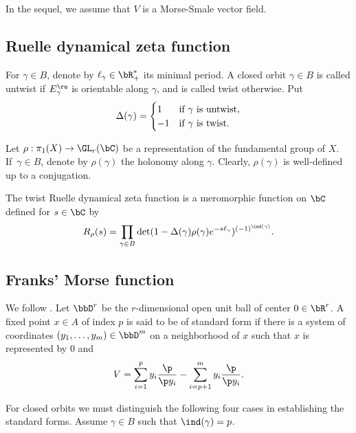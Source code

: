 In the sequel, we assume
that $V$ is a
Morse-Smale vector field.

\subsection{Ruelle dynamical zeta function}\label{sDZf}
For $\gamma\in B$, denote by $\ell_{\gamma}\in \bR^{*}_{+}$ its
minimal period. A closed orbit $\gamma\in B$
is called untwist if $E^{\ru}_{\gamma}$ is orientable along $\gamma$, and is
called twist otherwise. Put
\begin{equation}\label{Delta}
\Delta(\gamma)=
\begin{cases}
1&\hbox{if } \gamma \hbox{ is untwist},\\
-1&\hbox{if } \gamma \hbox{ is twist}.
\end{cases}
\end{equation}

Let $\rho:\pi_{1}(X)\to \GL_{r}(\bC)$ be a representation of the fundamental group of $X$. If~$\gamma\in B$, denote by $\rho(\gamma)$
the holonomy along $\gamma$. Clearly, $\rho(\gamma)$ is well-defined up to a conjugation.

\begin{defin} The twist Ruelle dynamical zeta function is a meromorphic
function on $\bC$ defined for $s\in \bC$ by
\begin{equation}\label{rrs}
R_{\rho}(s)=\prod_{\gamma\in
B}\det(1-\Delta(\gamma)\rho(\gamma)e^{-s
\ell_\gamma})^{(-1)^{\ind(\gamma)}}.
\end{equation}
\end{defin}

\subsection{Franks' Morse function}\label{sMSMF}
We follow \cite[\S 1]{Franks1979}. Let $\bbD^{r}$ be the
$r$-dimensional open unit ball of center $0\in
\bR^{r}$.
A fixed point $x\in A$ of index $p$ is said to be of standard form if there is a system of coordinates $(y_{1},\ldots, y_{m})\in \bbD^{m}$ on a neighborhood
of $x$ such that $x$ is represented by $0$ and
\begin{equation*}
V=\sum_{i=1}^{p}y_{i}\frac{\p}{\p
y_{i}}-\sum_{i=p+1}^{m}y_{i}\frac{\p}{\p y_{i}}.
\end{equation*}

For closed orbits we must distinguish the following four cases in
establishing the standard forms. Assume $\gamma\in B$ such that
$\ind(\gamma)=p$.

